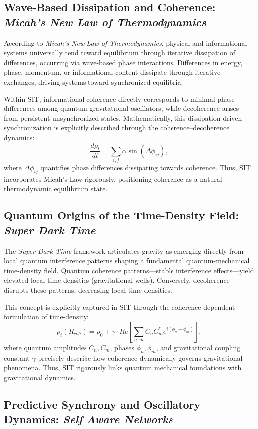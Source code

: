 \documentclass[american,11pt,letterpaper]{article}
\def\mathrm#1{#1}%
\begin{document}
\subsection{Wave-Based Dissipation and Coherence: \textit{Micah's New Law of Thermodynamics}}

According to \textit{Micah's New Law of Thermodynamics}, physical and informational systems universally tend toward equilibrium through iterative dissipation of differences, occurring via wave-based phase interactions. Differences in energy, phase, momentum, or informational content dissipate through iterative exchanges, driving systems toward synchronized equilibria.

Within SIT, informational coherence directly corresponds to minimal phase differences among quantum-gravitational oscillators, while decoherence arises from persistent unsynchronized states. Mathematically, this dissipation-driven synchronization is explicitly described through the coherence--decoherence dynamics:
\[
\frac{d\rho_t}{dt} = \sum_{i,j}\alpha \sin(\Delta\phi_{ij}),
\]
where \(\Delta\phi_{ij}\) quantifies phase differences dissipating towards coherence. Thus, SIT incorporates Micah's Law rigorously, positioning coherence as a natural thermodynamic equilibrium state.

\subsection{Quantum Origins of the Time-Density Field: \textit{Super Dark Time}}

The \textit{Super Dark Time} framework articulates gravity as emerging directly from local quantum interference patterns shaping a fundamental quantum-mechanical time-density field. Quantum coherence patterns---stable interference effects---yield elevated local time densities (gravitational wells). Conversely, decoherence disrupts these patterns, decreasing local time densities.

This concept is explicitly captured in SIT through the coherence-dependent formulation of time-density:
\[
\rho_t(R_{\mathrm{coh}}) = \rho_0 + \gamma \cdot \mathrm{Re}\left[\sum_{n,m} C_n C_m^* e^{i(\phi_n - \phi_m)}\right],
\]
where quantum amplitudes \(C_n, C_m\), phases \(\phi_n, \phi_m\), and gravitational coupling constant \(\gamma\) precisely describe how coherence dynamically governs gravitational phenomena. Thus, SIT rigorously links quantum mechanical foundations with gravitational dynamics.

\subsection{Predictive Synchrony and Oscillatory Dynamics: \textit{Self Aware Networks}}
\end{document}

